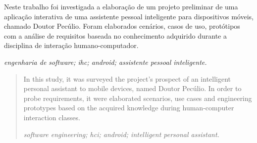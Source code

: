 
\begin{resumo} 
Neste trabalho foi investigada a elaboração de um projeto preliminar
de uma aplicação interativa de uma assistente pessoal inteligente para
dispositivos móveis, chamado Doutor Pecúlio.  Foram elaborados 
cenários, casos de uso, protótipos com a análise de requisitos
baseada no conhecimento adquirido durante a disciplina de 
interação humano-computador.   

  \item[\hskip\labelsep\bfseries\itshape Palavras-chave.]\itshape{
  engenharia de software; ihc; android; assistente pessoal inteligente.}
  
\end{resumo}

\begin{abstract}
In this study, it was surveyed the project's prospect of an 
intelligent personal assistant to mobile devices, named Doutor Pecúlio.
In order to probe requirements, it were elaborated scenarios, use cases and 
engineering prototypes based on the acquired
knowledge during human-computer interaction classes.

  \item[\hskip\labelsep\bfseries\itshape Palavras-chave.]\itshape{
  software engineering; hci; android; intelligent personal assistant.}
 
\end{abstract}
